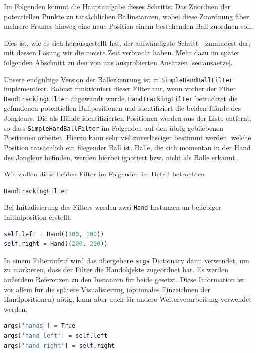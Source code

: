 \documentclass[12pt,a4paper,ngerman]{scrartcl}
\begin{document}
Im Folgenden kommt die Hauptaufgabe dieses Schritts: Das Zuordnen der potentiellen
Punkte zu tatsächlichen Ballinstanzen, wobei diese Zuordnung über mehrere Frames
hinweg eine neue Position einem bestehenden Ball zuordnen soll.

Dies ist, wie es sich herausgestellt hat, der aufwändigste Schritt - zumindest der, mit dessen Lösung wir die meiste Zeit verbracht haben. Mehr dazu im später folgenden Abschnitt zu den von uns ausprobierten Ansätzen \ref{sec:ansaetze}.

Unsere endgültige Version der Ballerkennung ist in \lstinline{SimpleHandBallFilter} 
implementiert. Robust funktioniert dieser Filter nur, wenn vorher der Filter 
\lstinline{HandTrackingFilter} angewandt wurde. \lstinline{HandTrackingFilter}  betrachtet die gefundenen potentiellen Ballpositionen und identifiziert die beiden Hände des Jongleurs. Die als Hände identifizierten Positionen werden aus der Liste entfernt, so dass \lstinline{SimpleHandBallFilter} im Folgenden auf den übrig gebliebenen Positionen arbeitet. Hierzu kann sehr viel zuverlässiger bestimmt werden, welche Position tatsächlich ein fliegender Ball ist. Bälle, die sich momentan in der Hand des Jongleur befinden, werden hierbei ignoriert bzw. nicht als Bälle erkannt. 

Wir wollen diese beiden Filter im Folgenden im Detail betrachten.

\lstinline{HandTrackingFilter}

Bei Initialisierung des Filters werden zwei \lstinline{Hand} Instanzen an beliebiger Initialposition erstellt.

\begin{lstlisting}[language=Python,caption={\lstinline{HandTracking.py}, Ausschnitt}]
self.left = Hand((100, 100))
self.right = Hand((200, 200))
\end{lstlisting}

In einem Filteraufruf wird das übergebene \lstinline{args} Dictionary dann 
verwendet, um zu markieren, dass der Filter die Handobjekte zugeordnet hat. Es 
werden außerdem Referenzen zu den Instanzen für beide gesetzt. Diese Information ist 
vor allem für die spätere Visualisierung (optionales Einzeichnen der Handpositionen)
nötig, kann aber auch für andere Weiterverarbeitung verwendet werden.

\begin{lstlisting}[language=Python,caption={\lstinline{HandTracking.py}, Ausschnitt}]
args['hands'] = True
args['hand_left'] = self.left
args['hand_right'] = self.right
\end{lstlisting}
\end{document}
